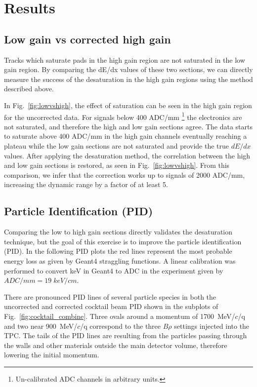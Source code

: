 \documentclass[review,number,sort&compress]{elsarticle}
\begin{document}
\section{Results}
\subsection{Low gain vs corrected high gain}

Tracks which saturate pads in the high gain region are not saturated in the low gain region. By comparing the dE/dx values of these two sections, we can directly measure the success of the desaturation in the high gain regions using the method described above.  
 
In Fig.~\ref{fig:lowvshigh}, the effect of saturation can be seen in the high gain region for the uncorrected data. For signals below 400 ADC/mm \footnote{Un-calibrated ADC channels in arbitrary units.} the electronics are not saturated, and therefore the high and low gain sections agree. The data starts to saturate above 400 ADC/mm in the high gain channels eventually reaching a plateau while the low gain sections are not saturated and provide the true $dE/dx$ values.
 After applying the desaturation method, the correlation between the high and low gain sections is restored, as seen in Fig.~\ref{fig:lowvshigh}. From this comparison, we infer that the correction works up to signals of 2000 ADC/mm, increasing the dynamic range by a factor of at least 5.

\subsection{Particle Identification (PID)}


Comparing the low to high gain sections directly validates the desaturation technique, but the goal  of this exercise is to improve the particle identification (PID). In the following PID plots the red lines represent the most probable energy loss as given by Geant4 straggling functions. A linear calibration was performed to convert keV in Geant4 to ADC in the experiment given by $ADC/mm = 19\;keV/cm$.

There are pronounced PID lines of several particle species in both the uncorrected and corrected cocktail beam PID shown in the subplots of Fig.~\ref{fig:cocktail_combine}. Three ovals around a momentum of 1700~MeV/$c$/q and two near 900~MeV/$c$/q correspond to the three $B\rho$ settings injected into the TPC. The tails of the PID lines are resulting from the particles passing through the walls and other materials outside the main detector volume, therefore lowering the initial momentum. 
\end{document}
